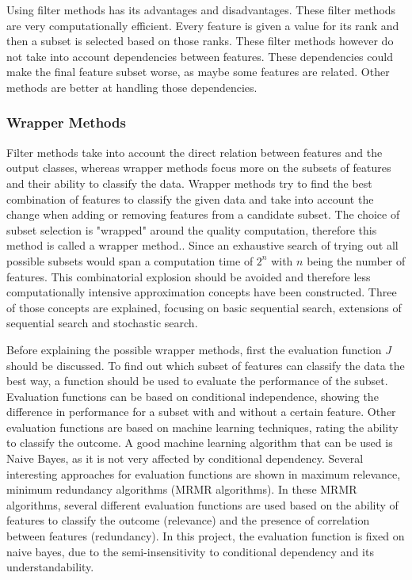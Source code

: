 \documentclass[10pt,a4paper]{report}
\begin{document}
	Using filter methods has its advantages and disadvantages. These filter methods are very computationally efficient. Every feature is given a value for its rank and then a subset is selected based on those ranks. These filter methods however do not take into account dependencies between features. These dependencies could make the final feature subset worse, as maybe some features are related. Other methods are better at handling those dependencies\cite{Duch2006, saeys2007review}.
	
	\subsubsection{Wrapper Methods}
	\label{FSsubsec:WrapperMethods}
	
	Filter methods take into account the direct relation between features and the output classes, whereas wrapper methods focus more on the subsets of features and their ability to classify the data. Wrapper methods try to find the best combination of features to classify the given data and take into account the change when adding or removing features from a candidate subset. The choice of subset selection is "wrapped"  around the quality computation, therefore this method is called a wrapper method.\cite{Reunanen2006}. Since an exhaustive search of trying out all possible subsets would span a computation time of $2^n$ with $n$ being the number of features\cite{Alsallakh2016PowerSet}. This combinatorial explosion should be avoided and therefore less computationally intensive approximation concepts have been constructed. Three of those concepts are explained, focusing on basic sequential search, extensions of sequential search and stochastic search.
	
	Before explaining the possible wrapper methods, first the evaluation function $J$ should be discussed. To find out which subset of features can classify the data the best way, a function should be used to evaluate the performance of the subset\cite{Reunanen2006}. Evaluation functions can be based on conditional independence\cite{Reunanen2006,tsamardinos2017massively}, showing the difference in performance for a subset with and without a certain feature. Other evaluation functions are based on machine learning techniques\cite{huang2013automated, saeys2007review}, rating the ability to classify the outcome. A good machine learning algorithm that can be used is Naive Bayes, as it is not very affected by conditional dependency\cite{zhang2004optimality}. Several interesting approaches for evaluation functions are shown in maximum relevance, minimum redundancy algorithms\cite{SENAWI201747, el2009new, radovic2017minimum} (MRMR algorithms). In these MRMR algorithms, several different evaluation functions are used based on the ability of features to classify the outcome (relevance) and the presence of correlation between features (redundancy). In this project, the evaluation function is fixed on naive bayes, due to the semi-insensitivity to conditional dependency and its understandability.
	
\end{document}
